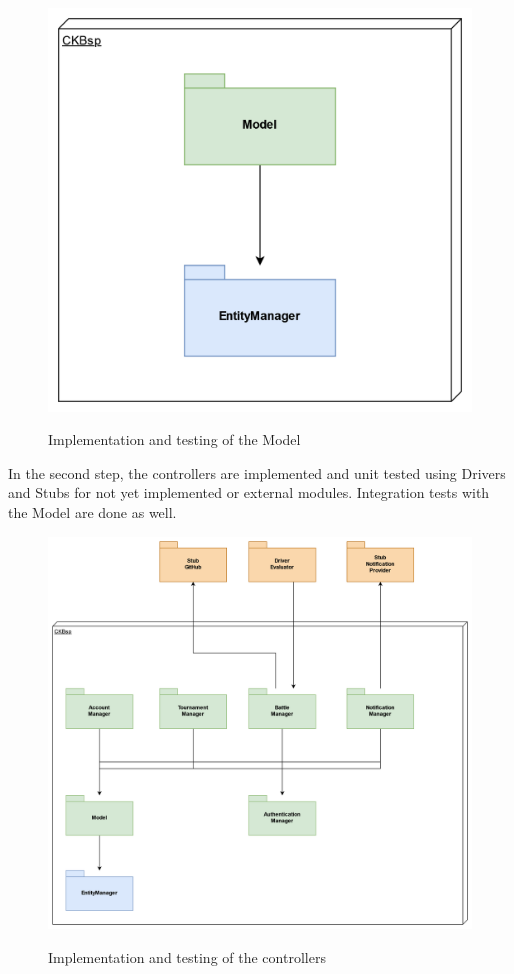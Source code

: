 \documentclass{Configuration_Files/Template}
\begin{document}
\begin{figure}[H]
\centering
\includegraphics[scale = 0.65]{Images/diagrams/ImplementationPlan_SS_First.png}\\
\caption{Implementation and testing of the Model}
\end{figure}

In the second step, the controllers are implemented and unit tested using Drivers and Stubs for not yet implemented or external modules. Integration tests with the Model are done as well.

\begin{figure}[H]
\centering
\includegraphics[scale = 0.65]{Images/diagrams/ImplementationPlan_SS_Second.png}\\
\caption{Implementation and testing of the controllers}
\end{figure}
\end{document}
